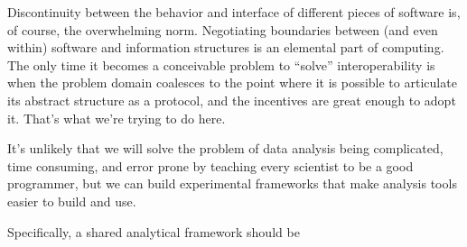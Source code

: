 Discontinuity between the behavior and interface of different pieces of
software is, of course, the overwhelming norm. Negotiating boundaries
between (and even within) software and information structures is an
elemental part of computing. The only time it becomes a conceivable
problem to ``solve'' interoperability is when the problem domain
coalesces to the point where it is possible to articulate its abstract
structure as a protocol, and the incentives are great enough to adopt
it. That's what we're trying to do here.

It's unlikely that we will solve the problem of data analysis being
complicated, time consuming, and error prone by teaching every scientist
to be a good programmer, but we can build experimental frameworks that
make analysis tools easier to build and use.

Specifically, a shared analytical framework should be

